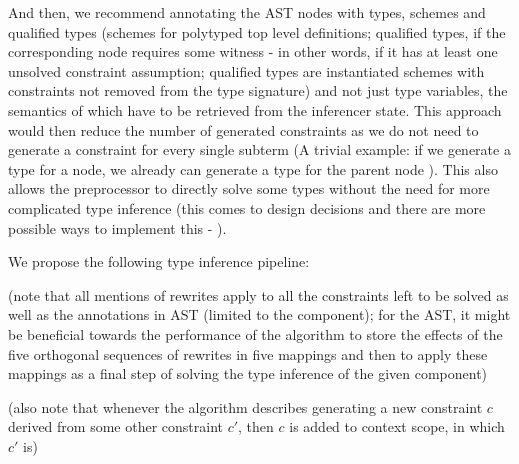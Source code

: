And then, we recommend annotating the AST nodes with types, schemes and qualified types (schemes for polytyped top level definitions; qualified types, if the corresponding node requires some witness - in other words, if it has at least one unsolved constraint assumption; qualified types are instantiated schemes with constraints not removed from the type signature) and not just type variables, the semantics of which have to be retrieved from the inferencer state. This approach would then reduce the number of generated constraints as we do not need to generate a constraint for every single subterm (A trivial example: if we generate a type  for a  node, we already can generate a type  for the parent node ). This also allows the preprocessor to directly solve some types without the need for more complicated type inference (this comes to design decisions and there are more possible ways to implement this - ).

We propose the following type inference pipeline:

(note that all mentions of rewrites apply to all the constraints left to be solved as well as the annotations in AST (limited to the component); for the AST, it might be beneficial towards the performance of the algorithm to store the effects of the five orthogonal sequences of rewrites in five mappings and then to apply these mappings as a final step of solving the type inference of the given component)

(also note that whenever the algorithm describes generating a new constraint $c$ derived from some other constraint $c'$, then $c$ is added to context scope, in which $c'$ is)

